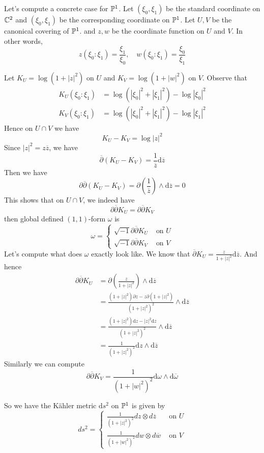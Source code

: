 \documentclass[11pt]{amsart}
\numberwithin{equation}{section}
\theoremstyle{plain}
\theoremstyle{plain}
\numberwithin{equation}{section}
\begin{document}
\bigskip

Let's compute a concrete case for $\Bbb{P}^1$. Let $(\xi_0,\xi_1)$ be the standard coordinate on $\Bbb{C}^2$ and $(\xi_0,\xi_1)$ be the corresponding coordinate on $\Bbb{P}^1$. Let $U,V$ be the canonical covering of $\Bbb{P}^1$. and $z,w$ be the coordinate function on $U$ and $V$. In other words,
$$
z(\xi_0:\xi_1)=\frac{\xi_1}{\xi_0},\quad w(\xi_0:\xi_1)=\frac{\xi_0}{\xi_1}
$$

Let $K_U=\log(1+|z|^2)$ on $U$ and $K_V=\log(1+|w|^2)$ on $V$. Observe that 
$$
\begin{aligned}
K_U(\xi_0:\xi_1)&=\log(|\xi_0|^2+|\xi_1|^2)-\log|\xi_0|^2\\
K_V(\xi_0:\xi_1)&=\log(|\xi_0|^2+|\xi_1|^2)-\log|\xi_1|^2
\end{aligned}
$$
Hence on $U\cap V$ we have
$$
K_U-K_V=\log|z|^2
$$
Since $|z|^2=z\overline{z}$, we have
$$
\overline{\partial}(K_U-K_V)=\frac{1}{\overline{z}}\mathrm{d}\overline{z}
$$
Then we have
$$
\partial\overline{\partial}(K_U-K_V)=\partial(\frac{1}{\overline{z}})\wedge\mathrm{d}\overline{z}=0
$$
This shows that on $U\cap V$, we indeed have
$$
\partial\overline{\partial}K_U=\partial\overline{\partial}K_V
$$
then global defined $(1,1)$-form $\omega$ is 
$$
\omega= \begin{cases}\sqrt{-1} \partial \overline{\partial} K_{U} & \text { on } U \\ \sqrt{-1} \partial \overline{\partial} K_{V} & \text { on } V\end{cases}
$$
Let's compute what does $\omega$ exactly look like. We know that $\overline{\partial}K_U=\frac{z}{1+|z|^2}\mathrm{d}\overline{z}$. And hence
$$
\begin{aligned}
\partial\overline{\partial}K_U&=\partial(\frac{z}{1+|z|^2})\wedge\mathrm{d}\overline{z}\\
&=\frac{(1+|z|^2)\partial z-z\partial(1+|z|^2)}{(1+|z|^2)^2}\wedge\mathrm{d}\overline{z}\\
&=\frac{(1+|z|^2)\mathrm{d}z-|z|^2\mathrm{d}z}{(1+|z|^2)^2}\wedge\mathrm{d}\overline{z}\\
&=\frac{1}{(1+|z|^2)^2}\mathrm{d}z\wedge\mathrm{d}\overline{z}
\end{aligned}
$$
Similarly we can compute
$$
\partial\overline{\partial}K_V=\frac{1}{(1+|w|^2)^2}\mathrm{d}\omega\wedge\mathrm{d}\overline{\omega}
$$

So we have the Kähler metric $\mathrm{d}s^2$ on $\Bbb{P}^1$ is given by
$$
d s^{2}= \begin{cases}\frac{1}{\left(1+|z|^{2}\right)^{2}} d z \otimes d \overline{z} & \text { on } U \\ \frac{1}{\left(1+|w|^{2}\right)^{2}} d w \otimes d \overline{w} & \text { on } V\end{cases}
$$
\end{document}
